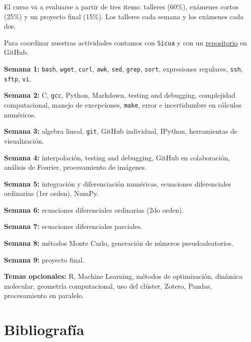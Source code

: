 \documentclass[letterpaper,10pt,onecolumn]{article}
\begin{document}
\vspace{0.3cm}
\noindent El curso va a evaluarse a partir de tres items: talleres (60\%), exámenes cortos (25\%) y un proyecto final (15\%). Los talleres cada semana y los exámenes cada dos.

\noindent Para coordinar nuestras actividades contamos con \verb+Sicua+ y con un \href{https://github.com/ComputoCienciasUniandes/MetodosComputacionales}{repositorio} en GitHub.

\vspace{0.5cm}

\noindent\textbf{Semana 1:} \verb+bash+, \verb+wget+, \verb+curl+, \verb+awk+, \verb+sed+, \verb+grep+, \verb+sort+, expresiones regulares, \verb+ssh+, \verb+sftp+, \verb+vi+.

\noindent\textbf{Semana 2:} C, \verb+gcc+, Python, Markdown, testing and debugging, complejidad computacional, manejo de excepciones, \verb+make+, error e incertidumbre en cálculos numéricos.

\noindent\textbf{Semana 3:} algebra lineal, \verb+git+, GitHub individual, IPython, herramientas de visualización.

\noindent\textbf{Semana 4:} interpolación, testing and debugging, GitHub en colaboración, análisis de Fourier, procesamiento de imágenes.

\noindent\textbf{Semana 5:} integración y diferenciación numéricas, ecuaciones diferenciales ordinarias (1er orden), NumPy.

\noindent\textbf{Semana 6:} ecuaciones diferenciales ordinarias (2do orden).

\noindent\textbf{Semana 7:} ecuaciones diferenciales parciales.

\noindent\textbf{Semana 8:} métodos Monte Carlo, generación de números pseudoaleatorios.

\noindent\textbf{Semana 9:} proyecto final.

\vspace{0.1cm}
\noindent\textbf{Temas opcionales:} R, Machine Learning, métodos de optimización, dinámica molecular, geometría computacional, uso del clúster, Zotero, Pandas, procesamiento en paralelo.

\section*{Bibliografía}
\end{document}
